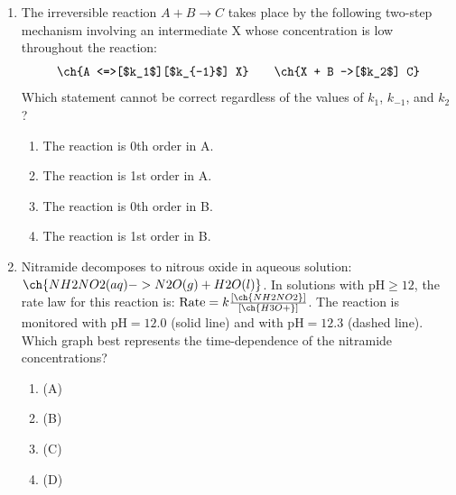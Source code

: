 \documentclass[twocolumn, 10pt]{article}
\begin{document}
\begin{enumerate}
    \item The irreversible reaction $A + B \rightarrow C$ takes place by the following two-step mechanism involving an intermediate X whose concentration is low throughout the reaction:
    \[ \ch{A <=>[$k_1$][$k_{-1}$] X} \qquad \ch{X + B ->[$k_2$] C} \]
    Which statement cannot be correct regardless of the values of $k_1$, $k_{-1}$, and $k_2$?
    \begin{enumerate}
        \item The reaction is 0th order in A.
        \item The reaction is 1st order in A.
        \item The reaction is 0th order in B.
        \item The reaction is 1st order in B.
    \end{enumerate}

    \item Nitramide decomposes to nitrous oxide in aqueous solution: $\ch{NH2NO2(aq) -> N2O(g) + H2O(l)}$. In solutions with $\text{pH} \ge 12$, the rate law for this reaction is: $\text{Rate} = k\frac{[\ch{NH2NO2}]}{[\ch{H3O+}]}$. The reaction is monitored with $\text{pH} = 12.0$ (solid line) and with $\text{pH} = 12.3$ (dashed line). Which graph best represents the time-dependence of the nitramide concentrations?
    
    \begin{center}
    \end{center}
    \begin{enumerate}
        \item (A)
        \item (B)
        \item (C)
        \item (D)
    \end{enumerate}


\end{enumerate}
\end{document}
